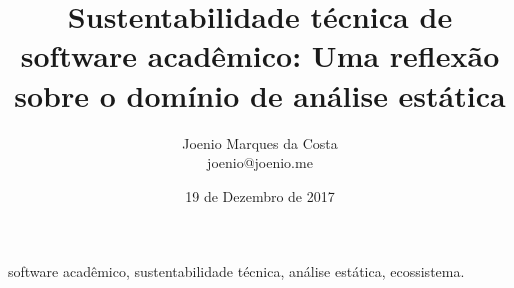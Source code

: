 \documentclass[msc, classic, a4paper]{ufbathesis}
\date{19 de Dezembro de 2017}
\title{
  Sustentabilidade técnica de software acadêmico:
  Uma reflexão sobre o domínio de análise estática
}
\author{Joenio Marques da Costa\\
  {\small joenio@joenio.me}
}
\begin{document}
\frontpage
\frontmatter
\presentationpage

\resumo



\begin{keywords}

software acadêmico, sustentabilidade técnica, análise estática, ecossistema.

\end{keywords}

\tableofcontents
\listoffigures
\listoftables
\mainmatter




















\backmatter


\appendix


\end{document}
